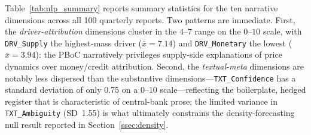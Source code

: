 \documentclass[AER]{AEA}
\begin{document}
Table~\ref{tab:nlp_summary} reports summary statistics for the ten narrative
dimensions across all 100 quarterly reports. Two patterns are immediate.
First, the \emph{driver-attribution} dimensions cluster in the $4$--$7$ range
on the $0$--$10$ scale, with \texttt{DRV\_Supply} the highest-mass driver
($\bar{x}=\num{7.14}$) and \texttt{DRV\_Monetary} the lowest
($\bar{x}=\num{3.94}$): the PBoC narratively privileges supply-side
explanations of price dynamics over money/credit attribution. Second, the
\emph{textual-meta} dimensions are notably less dispersed than the
substantive dimensions---\texttt{TXT\_Confidence} has a standard deviation of
only \num{0.75} on a $0$--$10$ scale---reflecting the boilerplate, hedged
register that is characteristic of central-bank prose; the limited variance
in \texttt{TXT\_Ambiguity} (SD~\num{1.55}) is what ultimately constrains the
density-forecasting null result reported in Section~\ref{ssec:density}.
\end{document}

